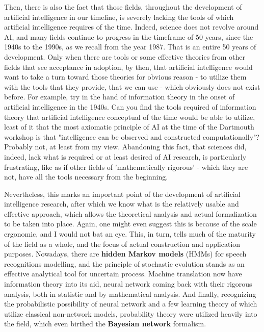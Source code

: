 Then, there is also the fact that those fields, throughout the development of artificial intelligence in our timeline, is severely lacking the tools of which artificial intelligence requires of the time. Indeed, science does not revolve around AI, and many fields continue to progress in the timeframe of 50 years, since the 1940s to the 1990s, as we recall from the year 1987. That is an entire 50 years of development. Only when there are tools or some effective theories from other fields that see acceptance in adoption, by then, that artificial intelligence would want to take a turn toward those theories for obvious reason - to utilize them with the tools that they provide, that we can use - which obviously does not exist before. For example, try in the hand of information theory in the onset of artificial intelligence in the 1940s. Can you find the tools required of information theory that artificial intelligence conceptual of the time would be able to utilize, least of it that the most axiomatic principle of AI at the time of the Dartmouth workshop is that "intelligence can be observed and constructed computationally"? Probably not, at least from my view. Abandoning this fact, that sciences did, indeed, lack what is required or at least desired of AI research, is particularly frustrating, like as if other fields of 'mathematically rigorous' - which they are not, have all the tools necessary from the beginning. 

Nevertheless, this marks an important point of the development of artificial intelligence research, after which we know what is the relatively usable and effective approach, which allows the theoretical analysis and actual formalization to be taken into place. Again, one might even suggest this is because of the scale ergonomic, and I would not bat an eye. This, in turn, tells much of the maturity of the field as a whole, and the focus of actual construction and application purposes. Nowadays, there are \textbf{hidden Markov models} (HMMs) for speech recognitions modelling, and the principle of stochastic evolution stands as an effective analytical tool for uncertain process. Machine translation now have information theory into its aid, neural network coming back with their rigorous analysis, both in statistic and by mathematical analysis. And finally, recognizing the probabilistic possibility of neural network and a few learning theory of which utilize classical non-network models, probability theory were utilized heavily into the field, which even birthed the \textbf{Bayesian network} formalism. 

